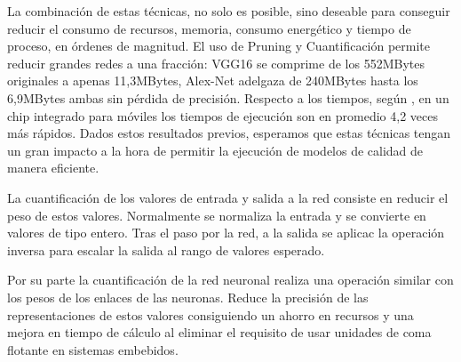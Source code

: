   La combinación de estas técnicas, no solo es posible, sino deseable para conseguir reducir el consumo de recursos, memoria, consumo energético y tiempo de proceso, en órdenes de magnitud. El uso de Pruning y Cuantificación permite reducir grandes redes a una fracción: VGG16 se comprime de los 552MBytes originales a apenas 11,3MBytes, Alex-Net adelgaza de 240MBytes hasta los 6,9MBytes ambas sin pérdida de precisión\cite{Han2015}. Respecto a los tiempos, según \citeauthor{Han2015}, en un chip integrado para móviles los tiempos de ejecución son en promedio 4,2 veces más rápidos. Dados estos resultados previos, esperamos que estas técnicas tengan un gran impacto a la hora de permitir la ejecución de modelos de calidad de manera eficiente.














La cuantificación de los valores de entrada y salida a la red consiste en reducir el peso de estos valores. Normalmente se normaliza la entrada y se convierte en valores de tipo entero. Tras el paso por la red, a la salida se aplicac la operación inversa para escalar la salida al rango de valores esperado.

Por su parte la cuantificación de la red neuronal realiza una operación similar con los pesos de los enlaces de las neuronas. Reduce la precisión de las representaciones de estos valores consiguiendo un ahorro en recursos y una mejora en tiempo de cálculo al eliminar el requisito de usar unidades de coma flotante en sistemas embebidos.




% 

